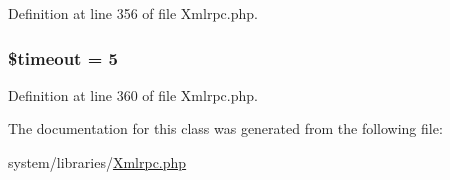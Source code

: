 Definition at line 356 of file Xmlrpc.\-php.

\hypertarget{class_x_m_l___r_p_c___client_a84320a9bf3e591d7ae20dfcb0dfe6a0d}{
\subsubsection[{\$timeout}]{\setlength{\rightskip}{0pt plus 5cm}\${\bf timeout} = 5}}\label{class_x_m_l___r_p_c___client_a84320a9bf3e591d7ae20dfcb0dfe6a0d}


Definition at line 360 of file Xmlrpc.\-php.



The documentation for this class was generated from the following file\-:\begin{DoxyCompactItemize}
\item 
system/libraries/\hyperlink{_xmlrpc_8php}{Xmlrpc.\-php}\end{DoxyCompactItemize}
